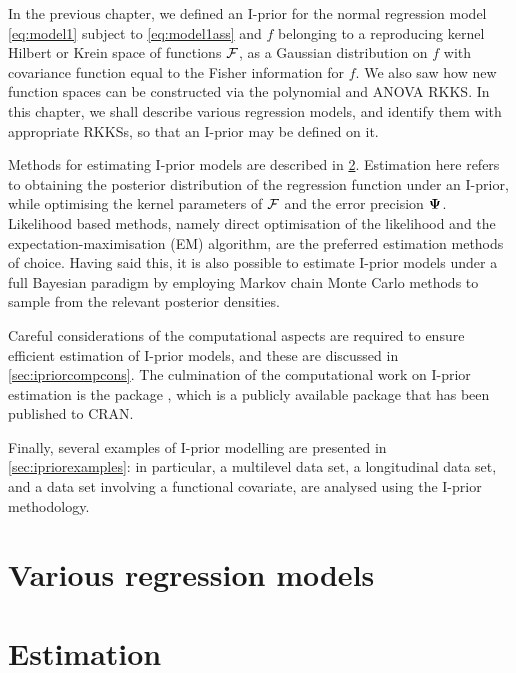 \documentclass[a4paper,showframe,11pt]{report}
\begin{document}

In the previous chapter, we defined an I-prior for the normal regression model \cref{eq:model1} subject to \cref{eq:model1ass} and $f$ belonging to a reproducing kernel Hilbert or Krein space of functions ${\mathcal F}$, as a Gaussian distribution on $f$ with covariance function equal to the Fisher information for $f$.
We also saw how new function spaces can be constructed via the polynomial and ANOVA RKKS.
In this chapter, we shall describe various regression models, and identify them with appropriate RKKSs, so that an I-prior may be defined on it.

Methods for estimating I-prior models are described in \cref{sec:ipriorestimation}.
Estimation here refers to obtaining the posterior distribution of the regression function under an I-prior, while optimising the kernel parameters of ${\mathcal F}$ and the error precision ${\bm\Psi}$.
Likelihood based methods, namely direct optimisation of the likelihood and the expectation-maximisation (EM) algorithm, are the preferred estimation methods of choice.
Having said this, it is also possible to estimate I-prior models under a full Bayesian paradigm by employing Markov chain Monte Carlo methods to sample from the relevant posterior densities.

Careful considerations of the computational aspects are required to ensure efficient estimation of I-prior models, and these are discussed in \cref{sec:ipriorcompcons}.
The culmination of the computational work on I-prior estimation is the  package \citep{jamil2017}, which is a publicly available  package that has been published to CRAN.

Finally, several examples of I-prior modelling are presented in  \cref{sec:ipriorexamples}: in particular, a multilevel data set, a longitudinal data set, and a data set involving a functional covariate, are analysed using the I-prior methodology.

\newpage
\section{Various regression models}\label{sec:various-regression}


\section{Estimation}\label{sec:ipriorestimation}

\end{document}
